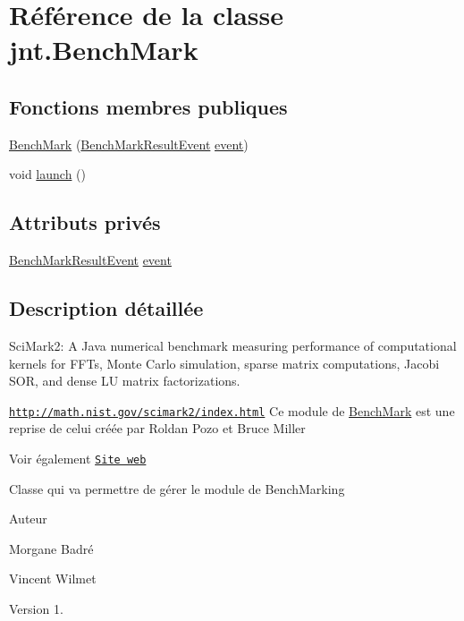 \hypertarget{classjnt_1_1BenchMark}{\section{Référence de la classe jnt.\-Bench\-Mark}
\label{classjnt_1_1BenchMark}
}
\subsection*{Fonctions membres publiques}
\begin{DoxyCompactItemize}
\item 
\hyperlink{classjnt_1_1BenchMark_a675ba55b21fb6d0a3a169d769df11a23}{Bench\-Mark} (\hyperlink{interfacejnt_1_1BenchMarkResultEvent}{Bench\-Mark\-Result\-Event} \hyperlink{classjnt_1_1BenchMark_abcb332d393fba2c18c7cb700bd651366}{event})
\item 
void \hyperlink{classjnt_1_1BenchMark_a3f04e42ad806345973e12d04b4601315}{launch} ()
\end{DoxyCompactItemize}
\subsection*{Attributs privés}
\begin{DoxyCompactItemize}
\item 
\hyperlink{interfacejnt_1_1BenchMarkResultEvent}{Bench\-Mark\-Result\-Event} \hyperlink{classjnt_1_1BenchMark_abcb332d393fba2c18c7cb700bd651366}{event}
\end{DoxyCompactItemize}


\subsection{Description détaillée}
Sci\-Mark2\-: A Java numerical benchmark measuring performance of computational kernels for F\-F\-Ts, Monte Carlo simulation, sparse matrix computations, Jacobi S\-O\-R, and dense L\-U matrix factorizations.

\href{http://math.nist.gov/scimark2/index.html}{\tt http\-://math.\-nist.\-gov/scimark2/index.\-html} Ce module de \hyperlink{classjnt_1_1BenchMark}{Bench\-Mark} est une reprise de celui créée par Roldan Pozo et Bruce Miller \begin{DoxySeeAlso}{Voir également}
\href{http://math.nist.gov/scimark2/}{\tt Site web} \par
 Classe qui va permettre de gérer le module de Bench\-Marking 
\end{DoxySeeAlso}
\begin{DoxyAuthor}{Auteur}

\begin{DoxyItemize}
\item Morgane Badré 
\item Vincent Wilmet 
\end{DoxyItemize}
\end{DoxyAuthor}
\begin{DoxyVersion}{Version}
1. 
\end{DoxyVersion}


